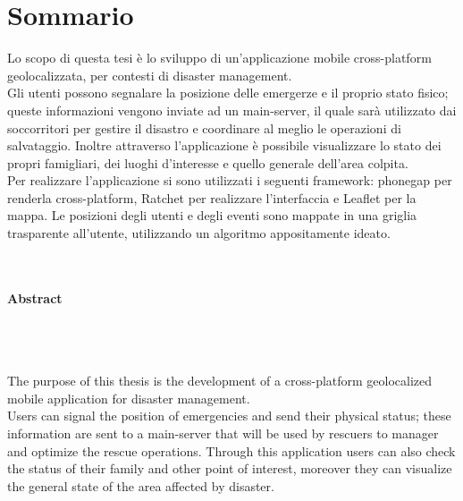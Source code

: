 \chapter*{Sommario}
\thispagestyle{empty}

Lo scopo di questa tesi è lo sviluppo di un'applicazione mobile cross-platform geolocalizzata, per contesti di disaster management.\\
 Gli utenti possono segnalare la posizione delle emergerze e il proprio stato fisico; queste informazioni vengono inviate ad un main-server, il quale sarà utilizzato dai soccorritori per gestire il disastro e coordinare al meglio le operazioni di salvataggio. Inoltre attraverso l'applicazione è possibile visualizzare lo stato dei propri famigliari, dei luoghi d'interesse e quello generale dell'area colpita.\\
 Per realizzare l'applicazione si sono utilizzati i seguenti framework: phonegap per renderla cross-platform, Ratchet per realizzare l'interfaccia e Leaflet per la mappa. Le posizioni degli utenti e degli eventi sono mappate in una griglia trasparente all'utente, utilizzando un algoritmo appositamente ideato.
\\
\\
\\
\noindent
\begin{Huge}
\textbf{Abstract}
\end{Huge}
\\
\\
\\
\noindent
The purpose of this thesis is the development of a cross-platform geolocalized mobile application for disaster management.\\
 Users can signal the position of emergencies and send their physical status; these information are sent to a main-server that will be used by rescuers to manager and optimize the rescue operations. Through this application users can also check the status of their family and other point of interest, moreover they can visualize the general state of the area affected by disaster.
